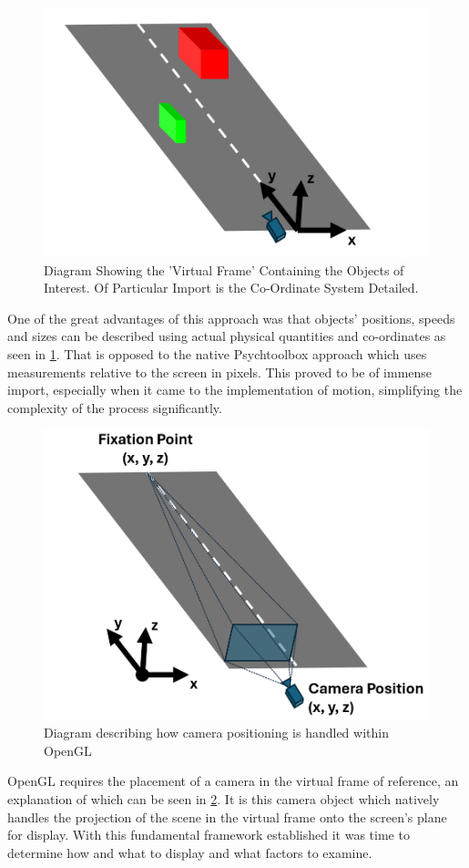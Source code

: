 \begin{figure}[H]
    \centering
    \includegraphics[width=0.45\linewidth]{figures/MET_Positioning.png}
    \caption{Diagram Showing the 'Virtual Frame' Containing the Objects of Interest. Of Particular Import is the Co-Ordinate System Detailed.}
    \label{fig:MET_Pos}
\end{figure}

One of the great advantages of this approach was that objects' positions, speeds and sizes can be described using actual physical quantities and co-ordinates as seen in \ref{fig:MET_Pos}. That is opposed to the native Psychtoolbox approach which uses measurements relative to the screen in pixels. This proved to be of immense import, especially when it came to the implementation of motion, simplifying the complexity of the process significantly.

\begin{figure}[H]
    \centering
    \includegraphics[width=0.45\linewidth]{figures/Camera Positioning.png}
    \caption{Diagram describing how camera positioning is handled within OpenGL}
    \label{fig:CameraPos}
\end{figure}

OpenGL requires the placement of a camera in the virtual frame of reference, an explanation of which can be seen in \ref{fig:CameraPos}. It is this camera object which natively handles the projection of the scene in the virtual frame onto the screen's plane for display. With this fundamental framework established it was time to determine how and what to display and what factors to examine.

